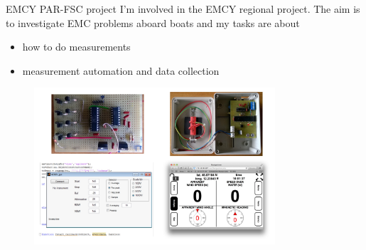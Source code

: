 \documentclass{beamer}
\begin{document}
\begin{frame}{EMCY PAR-FSC project}
    I'm involved in the EMCY regional project. The aim is to investigate EMC problems aboard boats and my tasks are about
    \begin{itemize}
        \item how to do measurements
        \item measurement automation and data collection
    \end{itemize}

    \begin{center}
        \begin{figure}
    \includegraphics[width=0.8\textwidth]{img/emcy}
        \end{figure}
    \end{center}

\end{frame}
\end{document}
